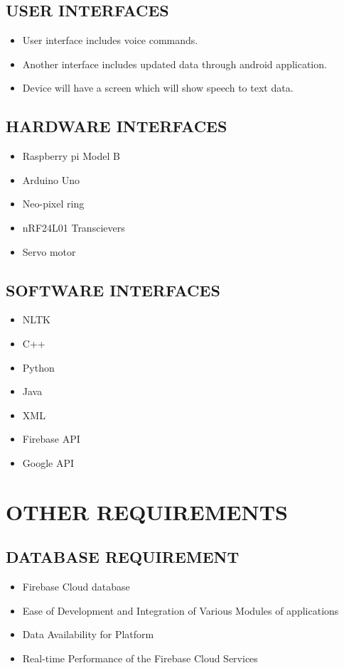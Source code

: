 \documentclass[12pt]{extreport}
\begin{document}
 \subsection{USER INTERFACES}
 \begin{itemize}
 \item User interface includes voice commands.
 \item Another interface includes updated data through android application.
 \item Device will have a screen which will show speech to text data. 
 \end{itemize}

    \subsection{HARDWARE INTERFACES}
\begin{itemize}
    \item Raspberry pi Model B
    \item Arduino Uno
    \item Neo-pixel ring
    \item nRF24L01 Transcievers
    \item Servo motor
\end{itemize}
    
    \subsection{SOFTWARE INTERFACES}
\begin{itemize}
\item NLTK
\item C++
\item Python
\item Java
\item XML
\item Firebase API
\item Google API
\end{itemize}

\section{OTHER REQUIREMENTS}
\subsection{DATABASE REQUIREMENT}
\begin{itemize}
\item Firebase Cloud database
\item Ease of Development and Integration of Various Modules of applications
\item Data Availability for Platform
\item Real-time Performance of the Firebase Cloud Services
\end{itemize}
\end{document}
